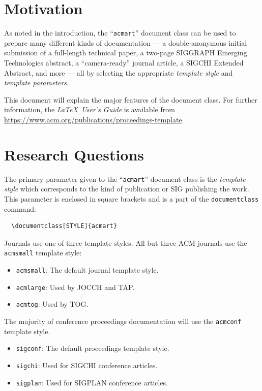 \documentclass[sigconf]{acmart}
\begin{document}
\section{Motivation}
As noted in the introduction, the ``\verb|acmart|'' document class can
be used to prepare many different kinds of documentation --- a
double-anonymous initial submission of a full-length technical paper, a
two-page SIGGRAPH Emerging Technologies abstract, a ``camera-ready''
journal article, a SIGCHI Extended Abstract, and more --- all by
selecting the appropriate {\itshape template style} and {\itshape
  template parameters}.

This document will explain the major features of the document
class. For further information, the {\itshape \LaTeX\ User's Guide} is
available from
\url{https://www.acm.org/publications/proceedings-template}.

\section{Research Questions}

The primary parameter given to the ``\verb|acmart|'' document class is
the {\itshape template style} which corresponds to the kind of publication
or SIG publishing the work. This parameter is enclosed in square
brackets and is a part of the {\verb|documentclass|} command:
\begin{verbatim}
  \documentclass[STYLE]{acmart}
\end{verbatim}

Journals use one of three template styles. All but three ACM journals
use the {\verb|acmsmall|} template style:
\begin{itemize}
\item {\texttt{acmsmall}}: The default journal template style.
\item {\texttt{acmlarge}}: Used by JOCCH and TAP.
\item {\texttt{acmtog}}: Used by TOG.
\end{itemize}

The majority of conference proceedings documentation will use the {\verb|acmconf|} template style.
\begin{itemize}
\item {\texttt{sigconf}}: The default proceedings template style.
\item{\texttt{sigchi}}: Used for SIGCHI conference articles.
\item{\texttt{sigplan}}: Used for SIGPLAN conference articles.
\end{itemize}
\end{document}
